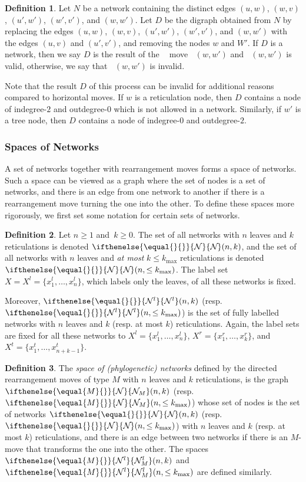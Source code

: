 \documentclass{article}
\theoremstyle{definition}
\newtheorem{definition}{Definition}
\newcommand{\N}[1][]{
\ifthenelse{\equal{#1}{}}{\mathcal{N}}{\mathcal{N}_{#1}}%
}
\newcommand{\Ni}[1][]{
\ifthenelse{\equal{#1}{}}{\mathcal{N}^l}{\mathcal{N}^l_{#1}}%
}
\DeclareMathOperator{\VM}{Vert^{--}}
\begin{document}
\begin{definition}\label{def:vmin}
Let $N$ be a network containing the distinct edges $(u,w)$, $(w,v)$, $(u',w')$, $(w',v')$, and $(w,w')$. Let $D$ be the digraph obtained from $N$ by replacing the edges $(u,w)$, $(w,v)$, $(u',w')$, $(w',v')$, and $(w,w')$ with the edges $(u,v)$ and $(u',v')$, and removing the nodes $w$ and $W'$. If $D$ is a network, then we say $D$ is the result of the $\VM$ move $\VM(w,w')$ and $\VM(w,w')$ is valid, otherwise, we say that $\VM(w,w')$ is invalid.
\end{definition}

Note that the result $D$ of this process can be invalid for additional reasons compared to horizontal moves. If $w$ is a reticulation node, then $D$ contains a node of indegree-$2$ and outdegree-$0$ which is not allowed in a network. Similarly, if $w'$ is a tree node, then $D$ contains a node of indegree-$0$ and outdegree-$2$.

\subsubsection{Spaces of Networks}
A set of networks together with rearrangement moves forms a space of networks. Such a space can be viewed as a graph where the set of nodes is a set of networks, and there is an edge from one network to another if there is a rearrangement move turning the one into the other. To define these spaces more rigorously, we first set some notation for certain sets of networks.

\begin{definition}
Let $n\geq 1$ and~$k\geq 0$. The set of all networks with $n$ leaves and $k$ reticulations is denoted $\N(n,k)$, and the set of all networks with $n$ leaves and \textit{at most} $k\leq k_{\mathrm{max}}$ reticulations is denoted $\N(n,\leq k_{\mathrm{max}})$. The label set $X=X^l=\{x^l_1,\ldots,x^l_n\}$, which labels only the leaves, of all these networks is fixed.

Moreover, $\Ni(n,k)$ (resp. $\Ni(n,\leq k_{\mathrm{max}})$) is the set of fully labelled networks with $n$ leaves and $k$ (resp. at most $k$) reticulations. Again, the label sets are fixed for all these networks to $X^l=\{x^l_1,\ldots,x^l_n\}$, $X^r=\{x^r_1,\ldots,x^r_k\}$, and $X^t=\{x^t_1,\ldots,x^t_{n+k-1}\}$. 
\end{definition}


\begin{definition}
The \emph{space of (phylogenetic) networks} defined by the directed rearrangement moves of type $M$ with $n$ leaves and $k$ reticulations, is the graph $\N[M](n,k)$ (resp. $\N[M](n,\leq k_{\mathrm{max}})$) whose set of nodes is the set of networks $\N(n,k)$ (resp. $\N(n,\leq k_{\mathrm{max}})$) with $n$ leaves and $k$ (resp. at most $k$) reticulations, and there is an edge between two networks if there is an $M$-move that transforms the one into the other.
The spaces $\Ni[M](n,k)$ and $\Ni[M](n,\leq k_{\mathrm{max}})$ are defined similarly.
\end{definition}
\end{document}
